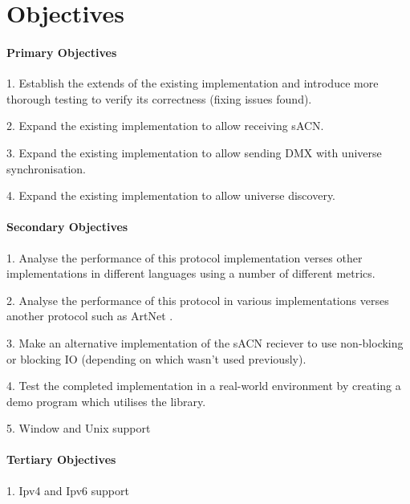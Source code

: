 \documentclass[12pt,a4paper,notitlepage]{report}
\begin{document}
\section*{Objectives}
\paragraph*{Primary Objectives}
\begin{list}{}{}
	\item 1. Establish the extends of the existing implementation and introduce more thorough testing to verify its correctness (fixing issues found).
	\item 2. Expand the existing implementation to allow receiving sACN.
	\item 3. Expand the existing implementation to allow sending DMX with universe synchronisation.
	\item 4. Expand the existing implementation to allow universe discovery.
\end{list}

\paragraph*{Secondary Objectives}
\begin{list}{}{}
	\item 1. Analyse the performance of this protocol implementation verses other implementations in different languages using a number of different metrics.
	\item 2. Analyse the performance of this protocol in various implementations verses another protocol such as ArtNet \cite{ArtNet}.
	\item 3. Make an alternative implementation of the sACN reciever to use non-blocking or blocking IO (depending on which wasn't used previously).
	\item 4. Test the completed implementation in a real-world environment by creating a demo program which utilises the library. 
	\item 5. Window and Unix support
\end{list}

\paragraph*{Tertiary Objectives}
\begin{list}{}{}
	\item 1. Ipv4 and Ipv6 support
\end{list}
\end{document}
